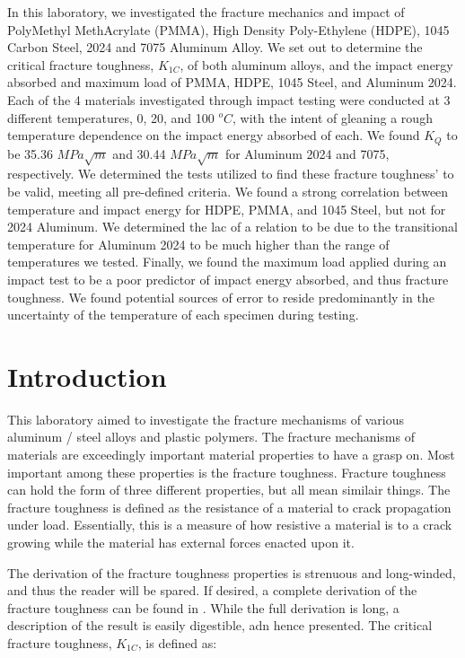 \documentclass{article}
\begin{document}
In this laboratory, we investigated the fracture mechanics and impact of PolyMethyl MethAcrylate (PMMA), High Density Poly-Ethylene (HDPE), 1045 Carbon Steel, 2024 and 7075 Aluminum Alloy. We set out to determine the critical fracture toughness, $K_{1C}$, of both aluminum alloys, and the impact energy absorbed and maximum load of PMMA, HDPE, 1045 Steel, and Aluminum 2024. Each of the 4 materials investigated through impact testing were conducted at 3 different temperatures, 0, 20, and 100 $^oC$, with the intent of gleaning a rough temperature dependence on the impact energy absorbed of each. We found $K_Q$ to be 35.36 $MPa\sqrt{m}$ and 30.44 $MPa\sqrt{m}$ for Aluminum 2024 and 7075, respectively. We determined the tests utilized to find these fracture toughness' to be valid, meeting all pre-defined criteria. We found a strong correlation between temperature and impact energy for HDPE, PMMA, and 1045 Steel, but not for 2024 Aluminum. We determined the lac of a relation to be due to the transitional temperature for Aluminum 2024 to be much higher than the range of temperatures we tested. Finally, we found the maximum load applied during an impact test to be a poor predictor of impact energy absorbed, and thus fracture toughness. We found potential sources of error to reside predominantly in the uncertainty of the temperature of each specimen during testing. 

\section{Introduction}

This laboratory aimed to investigate the fracture mechanisms of various aluminum / steel alloys and plastic polymers. The fracture mechanisms of materials are exceedingly important material properties to have a grasp on. Most important among these properties is the fracture toughness. Fracture toughness can hold the form of three different properties, but all mean similair things. The fracture toughness is defined as the resistance of a material to crack propagation under load. Essentially, this is a measure of how resistive a material is to a crack growing while the material has external forces enacted upon it. 

The derivation of the fracture toughness properties is strenuous and long-winded, and thus the reader will be spared. If desired, a complete derivation of the fracture toughness can be found in \cite{manual}. While the full derivation is long, a description of the result is easily digestible, adn hence presented. The critical fracture toughness, $K_{1C}$, is defined as:
\end{document}
